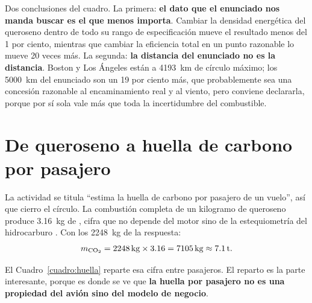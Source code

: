 \documentclass[11pt,letterpaper]{article}
\begin{document}
Dos conclusiones del cuadro. La primera: \textbf{el dato que el enunciado nos
manda buscar es el que menos importa}. Cambiar la densidad energética del
queroseno dentro de todo su rango de especificación mueve el resultado menos
del 1 por ciento, mientras que cambiar la eficiencia total en un punto
razonable lo mueve 20 veces más. La segunda: \textbf{la distancia del enunciado
no es la distancia}. Boston y Los Ángeles están a \SI{4193}{\kilo\meter} de
círculo máximo; los \SI{5000}{\kilo\meter} del enunciado son un 19 por ciento
más, que probablemente sea una concesión razonable al encaminamiento real y al
viento, pero conviene declararla, porque por sí sola vale más que toda la
incertidumbre del combustible.

\section{De queroseno a huella de carbono por pasajero}

La actividad se titula \enquote{estima la huella de carbono por pasajero de un
vuelo}, así que cierro el círculo. La combustión completa de un kilogramo de
queroseno produce \SI{3.16}{\kilogram} de , cifra que no depende del
motor sino de la estequiometría del hidrocarburo \parencite{icaocalc}. Con los
\SI{2248}{\kilogram} de la respuesta:
\begin{equation}
m_{\ce{CO2}} = \SI{2248}{\kilogram}\times\num{3.16}
             = \SI{7105}{\kilogram} \approx \SI{7.1}{\tonne}.
\end{equation}

El Cuadro~\ref{cuadro:huella} reparte esa cifra entre pasajeros. El reparto es
la parte interesante, porque es donde se ve que \textbf{la huella por pasajero
no es una propiedad del avión sino del modelo de negocio}.
\end{document}
